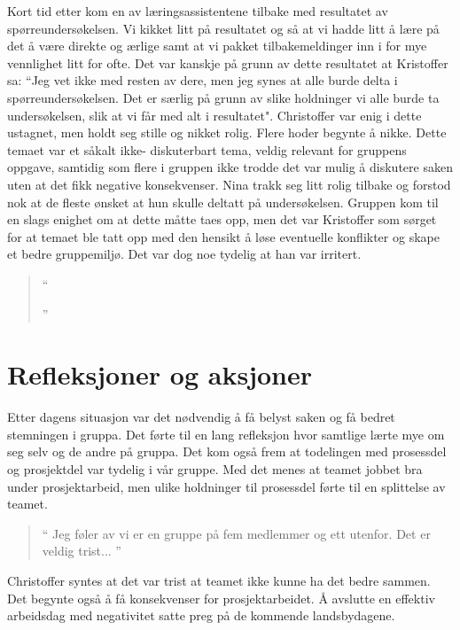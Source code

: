 Kort tid etter kom en av læringsassistentene tilbake med resultatet av spørreundersøkelsen. Vi kikket litt på resultatet og 
så at vi hadde litt å lære på det å være direkte og ærlige samt at vi pakket tilbakemeldinger inn i for mye vennlighet litt for ofte.
Det var kanskje på grunn av dette resultatet at Kristoffer sa: ``Jeg vet ikke med resten av dere, men jeg synes at alle burde
delta i spørreundersøkelsen. Det er særlig på grunn av slike holdninger vi alle burde ta undersøkelsen, slik at vi får med alt
i resultatet". Christoffer var enig i dette ustagnet, men holdt seg stille og nikket rolig. Flere hoder begynte å nikke. 
Dette temaet var et  såkalt ikke- diskuterbart tema, veldig relevant for gruppens oppgave, 
samtidig som flere i gruppen ikke trodde det var mulig å diskutere saken uten at det fikk negative konsekvenser. 
\cite{Artikkel3} Nina 
trakk seg litt rolig tilbake og forstod nok at de fleste ønsket at hun skulle deltatt på undersøkelsen. Gruppen kom 
til en slags enighet om at dette måtte taes opp, men det var Kristoffer som sørget for at temaet ble tatt opp med den hensikt å løse eventuelle
konflikter og skape et bedre gruppemiljø. Det var dog noe tydelig at han var irritert.

\begin{quote}``

''\end{quote} 

\section{Refleksjoner og aksjoner}

Etter dagens situasjon var det nødvendig å få belyst saken og få bedret stemningen i gruppa. Det førte til en lang
refleksjon hvor samtlige lærte mye om seg selv og de andre på gruppa. Det kom også frem at todelingen med prosessdel
og prosjektdel var tydelig i vår gruppe. Med det menes at teamet jobbet bra under prosjektarbeid, men ulike holdninger
til prosessdel førte til en splittelse av teamet. 

\begin{quote}``
Jeg føler av vi er en gruppe på fem medlemmer og ett utenfor. Det er veldig trist...
''\end{quote} 

Christoffer syntes at det var trist at teamet ikke kunne ha det bedre sammen. Det begynte også å få konsekvenser
for prosjektarbeidet. Å avslutte en effektiv arbeidsdag med negativitet satte preg på de kommende landsbydagene.

